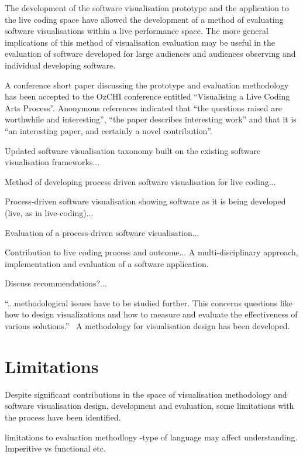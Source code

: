 The development of the software visualisation prototype and the application to the live coding space have allowed the development of a method of evaluating software visualisations within a live performance space. The more general implications of this method of visualisation evaluation may be useful in the evaluation of software developed for large audiences and audiences observing and individual developing software.

A conference short paper discussing the prototype and evaluation methodology has been accepted to the OzCHI conference entitled ``Visualising a Live Coding Arts Process''. Anonymous references indicated that ``the questions raised are worthwhile and interesting'', ``the paper describes interesting work'' and that it is ``an interesting paper, and certainly a novel contribution''.


Updated software visualisation taxonomy built on the existing software visualisation frameworks...

Method of developing process driven software visualisation for live coding...

Process-driven software visualisation showing software as it is being developed (live, as in live-coding)...

Evaluation of a process-driven software visualisation...

Contribution to live coding process and outcome... A multi-disciplinary approach, implementation and evaluation of a software application.

Discuss recommendations?...

``...methodological issues have to be studied further. This concerns questions like how to design visualizations and how to measure and evaluate the effectiveness of various solutions.''~\cite{VanWijk2005} A methodology for visualisation design has been developed.


\section{Limitations}

Despite significant contributions in the space of visualisation methodology and software visualisation design, development and evaluation, some limitations with the process have been identified.

limitations to evaluation methodlogy
-type of language may affect understanding. Imperitive vs functional etc.

